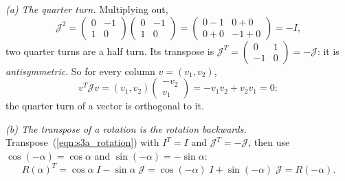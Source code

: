 \emph{(a) The quarter turn.} Multiplying out,
\begin{equation*}
\mathcal J^2 = \begin{pmatrix} 0 & -1 \\ 1 & 0 \end{pmatrix}\begin{pmatrix} 0 & -1 \\ 1 & 0 \end{pmatrix} = \begin{pmatrix} 0 - 1 & 0 + 0 \\ 0 + 0 & -1 + 0 \end{pmatrix} = -I ,
\end{equation*}
two quarter turns are a half turn. Its transpose is $\mathcal J^T = \left(\begin{smallmatrix} 0 & 1 \\ -1 & 0 \end{smallmatrix}\right) = -\mathcal J$: it is \emph{antisymmetric}. So for every column $v = (v_1, v_2)$,
\begin{equation}
\label{eqn:s3a_antisym}
v^T\mathcal J v = (v_1, v_2)\begin{pmatrix} -v_2 \\ v_1 \end{pmatrix} = -v_1v_2 + v_2v_1 = 0 :
\end{equation}
the quarter turn of a vector is orthogonal to it.

\emph{(b) The transpose of a rotation is the rotation backwards.} Transpose~(\ref{eqn:s3a_rotation}) with $I^T = I$ and $\mathcal J^T = -\mathcal J$, then use $\cos(-\alpha) = \cos\alpha$ and $\sin(-\alpha) = -\sin\alpha$:
\begin{equation}
\label{eqn:s3a_exp_rev}
R(\alpha)^T = \cos\alpha\; I - \sin\alpha\; \mathcal J = \cos(-\alpha)\; I + \sin(-\alpha)\;\mathcal J = R(-\alpha) .
\end{equation}

